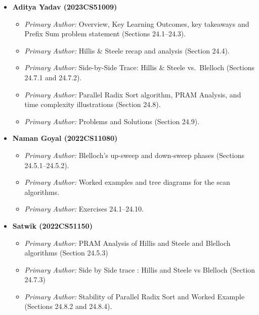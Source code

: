 \begin{itemize}[leftmargin=*]
  \item \textbf{Aditya Yadav (2023CS51009)}
  \begin{itemize}
    \item \emph{Primary Author:} Overview, Key Learning Outcomes, key takeaways and
          Prefix Sum problem statement (Sections 24.1--24.3).
    \item \emph{Primary Author:} Hillis \& Steele recap and analysis
          (Section 24.4).
    \item \emph{Primary Author:} Side-by-Side Trace: Hillis \& Steele vs.\ Blelloch (Sections 24.7.1 and 24.7.2).
    \item \emph{Primary Author:} Parallel Radix Sort algorithm, PRAM Analysis, and time complexity illustrations (Section 24.8).
    \item \emph{Primary Author:} Problems and Solutions (Section 24.9).
  \end{itemize}

  \item \textbf{Naman Goyal (2022CS11080)}
  \begin{itemize}
    \item \emph{Primary Author:} Blelloch's up-sweep and down-sweep
          phases (Sections 24.5.1--24.5.2).
    \item \emph{Primary Author:} Worked examples and tree diagrams for
          the scan algorithms.
    \item \emph{Primary Author:} Exercises 24.1--24.10.
          
  \end{itemize}
  
    \item \textbf{Satwik (2022CS51150)}
  \begin{itemize}
    \item \emph{Primary Author:} PRAM Analysis of Hillis and Steele and Blelloch algorithms
    (Section 24.5.3)
    \item \emph{Primary Author:} Side by Side trace : Hillis and Steele vs Blelloch (Section 24.7.3)
    \item \emph{Primary Author:} Stability of Parallel Radix Sort and Worked Example (Sections 24.8.2 and 24.8.4).
          
  \end{itemize}



\end{itemize}
